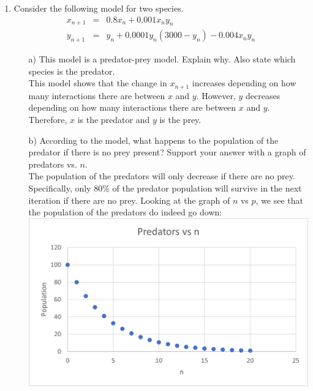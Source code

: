 \documentclass[12pt,letterpaper]{article}
\begin{document}
\begin{enumerate}
\item 
Consider the following  model for two species.   
\begin{eqnarray*}
x_{n+1} &=& 0.8x_{n} + 0.001x_{n}y_{n}\\
y_{n+1}&=& y_{n} +0.0001y_{n}(3000-y_{n}) -0.004x_{n}y_{n}
\end{eqnarray*}

\begin{enumerate}
\item[a)] This model is a predator-prey model. Explain why. Also state which species is the predator. \\
This model shows that the change in $x_{n+1}$ increases depending on how many interactions 
there are between $x$ and $y$. However, $y$ decreases depending on how many interactions there are between 
$x$ and $y$. Therefore, $x$ is the predator and $y$ is the prey. 

\item[b)] According to the model, what happens to the population of the predator if there is no prey present? Support your answer with a graph of predators vs. $n$.\\
The population of the predators will only decrease if there are no prey. Specifically, only 80\%
of the predator population will survive in the next iteration if there are no prey. Looking
at the graph of $n$ vs $p$, we see that the population of the predators do indeed go down: \\
\includegraphics[scale = .5]{n vs p.png} 


\end{enumerate}
\end{enumerate}
\end{document}
